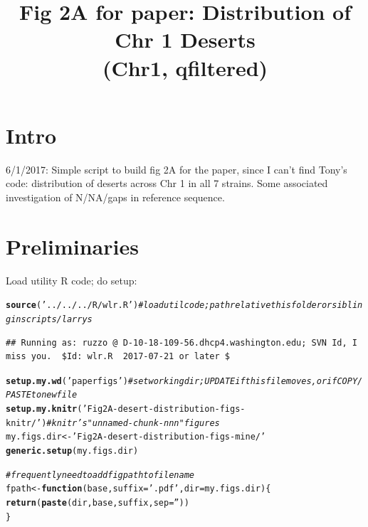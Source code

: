 \documentclass{article}\usepackage[]{graphicx}\usepackage[]{color}
\makeatletter
\newcommand{\hlstr}[1]{\textcolor[rgb]{0.192,0.494,0.8}{#1}}%
\newcommand{\hlcom}[1]{\textcolor[rgb]{0.678,0.584,0.686}{\textit{#1}}}%
\newcommand{\hlstd}[1]{\textcolor[rgb]{0.345,0.345,0.345}{#1}}%
\newcommand{\hlkwa}[1]{\textcolor[rgb]{0.161,0.373,0.58}{\textbf{#1}}}%
\newcommand{\hlkwb}[1]{\textcolor[rgb]{0.69,0.353,0.396}{#1}}%
\newcommand{\hlkwc}[1]{\textcolor[rgb]{0.333,0.667,0.333}{#1}}%
\newcommand{\hlkwd}[1]{\textcolor[rgb]{0.737,0.353,0.396}{\textbf{#1}}}%
\newenvironment{kframe}{%
 \def\at@end@of@kframe{}%
 \ifinner\ifhmode%
  \def\at@end@of@kframe{\end{minipage}}%
  \begin{minipage}{\columnwidth}%
 \fi\fi%
 \def\FrameCommand##1{\hskip\@totalleftmargin \hskip-\fboxsep
 \colorbox{shadecolor}{##1}\hskip-\fboxsep
     \hskip-\linewidth \hskip-\@totalleftmargin \hskip\columnwidth}%
 \MakeFramed {\advance\hsize-\width
   \@totalleftmargin\z@ \linewidth\hsize
   \@setminipage}}%
 {\par\unskip\endMakeFramed%
 \at@end@of@kframe}
\newenvironment{knitrout}{}{} %
\makeatother
\begin{document}
\title{Fig 2A for paper: Distribution of Chr 1 Deserts\\\large(Chr1, qfiltered)}
\maketitle

\tableofcontents

\section{Intro}
6/1/2017: Simple  script to build fig 2A for the paper, since I can't find Tony's code: distribution of deserts across Chr 1 in all 7 strains.  Some associated investigation of N/NA/gaps in reference sequence.

\section{Preliminaries}
Load utility R code; do setup:

\begin{knitrout}\footnotesize
{}\color{fgcolor}\begin{kframe}
\begin{alltt}
\hlkwd{source}\hlstd{(}\hlstr{'../../../R/wlr.R'}\hlstd{)} \hlcom{# load util code; path relative this folder or sibling in scripts/larrys }
\end{alltt}
\begin{verbatim}
## Running as: ruzzo @ D-10-18-109-56.dhcp4.washington.edu; SVN Id, I miss you.  $Id: wlr.R  2017-07-21 or later $
\end{verbatim}
\begin{alltt}
\hlkwd{setup.my.wd}\hlstd{(}\hlstr{'paperfigs'}\hlstd{)} \hlcom{# set working dir; UPDATE if this file moves, or if COPY/PASTE to new file}
\hlkwd{setup.my.knitr}\hlstd{(}\hlstr{'Fig2A-desert-distribution-figs-knitr/'}\hlstd{)} \hlcom{# knitr's "unnamed-chunk-nnn" figures}
\hlstd{my.figs.dir} \hlkwb{<-} \hlstr{'Fig2A-desert-distribution-figs-mine/'}
\hlkwd{generic.setup}\hlstd{(my.figs.dir)}
\end{alltt}
\end{kframe}
\end{knitrout}
\begin{knitrout}\footnotesize
{}\color{fgcolor}\begin{kframe}
\begin{alltt}
\hlcom{# frequently need to add figpath to file name}
\hlstd{fpath} \hlkwb{<-} \hlkwa{function}\hlstd{(}\hlkwc{base}\hlstd{,} \hlkwc{suffix}\hlstd{=}\hlstr{'.pdf'}\hlstd{,} \hlkwc{dir}\hlstd{=my.figs.dir)\{}
  \hlkwd{return}\hlstd{(}\hlkwd{paste}\hlstd{(dir, base, suffix,} \hlkwc{sep}\hlstd{=}\hlstr{''}\hlstd{))}
\hlstd{\}}
\end{alltt}
\end{kframe}
\end{knitrout}
\end{document}
